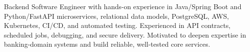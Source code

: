\par{
Backend Software Engineer with hands-on experience in Java/Spring Boot and Python/FastAPI microservices, relational data models, PostgreSQL, AWS, Kubernetes, CI/CD, and automated testing. Experienced in API contracts, scheduled jobs, debugging, and secure delivery. Motivated to deepen expertise in banking-domain systems and build reliable, well-tested core services.
}
